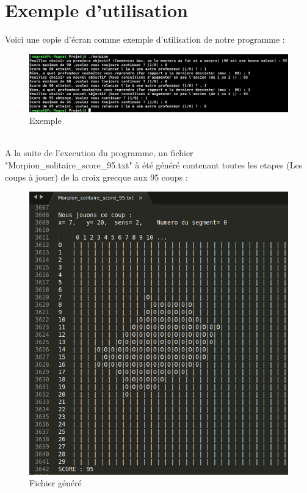 \documentclass[11pt]{article}
\begin{document}
		\section{Exemple d'utilisation}
		Voici une copie d'écran comme exemple d'utilisation de notre programme :
		\begin{figure}[!h]
\centering
\includegraphics[scale=1.40]{screenderoulement.png}
\caption{Exemple}
\label{}
\end{figure}
\\A la suite de l'execution du programme, un fichier "Morpion\_solitaire\_score\_95.txt" à été généré contenant toutes les etapes (Les coups à jouer) de la croix grecque aux 95 coups :
\begin{figure}[!h]
\centering
\includegraphics[scale=2.00]{exemple95.png}
\caption{Fichier généré}
\label{}
\end{figure}
\end{document}
